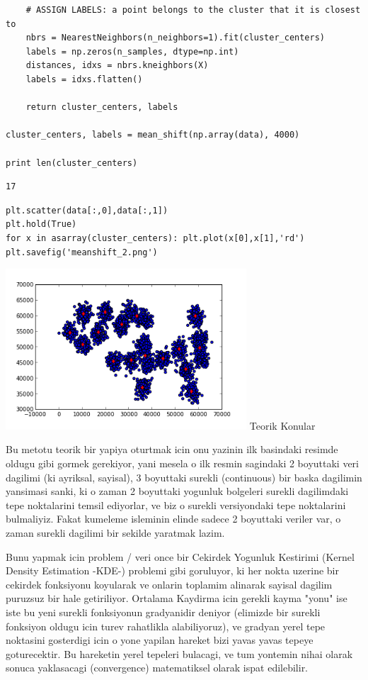\documentclass[12pt,fleqn]{article}\usepackage{../common}
\begin{document}
\begin{verbatim}
    # ASSIGN LABELS: a point belongs to the cluster that it is closest to
    nbrs = NearestNeighbors(n_neighbors=1).fit(cluster_centers)
    labels = np.zeros(n_samples, dtype=np.int)
    distances, idxs = nbrs.kneighbors(X)
    labels = idxs.flatten()
    
    return cluster_centers, labels

cluster_centers, labels = mean_shift(np.array(data), 4000)

print len(cluster_centers)
\end{verbatim}

\begin{verbatim}
17
\end{verbatim}

\begin{verbatim}
plt.scatter(data[:,0],data[:,1])
plt.hold(True)
for x in asarray(cluster_centers): plt.plot(x[0],x[1],'rd')
plt.savefig('meanshift_2.png')
\end{verbatim}

\includegraphics[height=6cm]{meanshift_2.png}
Teorik Konular

Bu metotu teorik bir yapiya oturtmak icin onu yazinin ilk basindaki
resimde oldugu gibi gormek gerekiyor, yani mesela o ilk resmin
sagindaki 2 boyuttaki veri dagilimi (ki ayriksal, sayisal), 3
boyuttaki surekli (continuous) bir baska dagilimin yansimasi sanki, ki
o zaman 2 boyuttaki yogunluk bolgeleri surekli dagilimdaki tepe
noktalarini temsil ediyorlar, ve biz o surekli versiyondaki tepe
noktalarini bulmaliyiz. Fakat kumeleme isleminin elinde sadece 2
boyuttaki veriler var, o zaman surekli dagilimi bir sekilde yaratmak
lazim.

Bunu yapmak icin problem / veri once bir Cekirdek Yogunluk Kestirimi
(Kernel Density Estimation -KDE-) problemi gibi goruluyor, ki her
nokta uzerine bir cekirdek fonksiyonu koyularak ve onlarin toplamim
alinarak sayisal dagilim puruzsuz bir hale getiriliyor. Ortalama
Kaydirma icin gerekli kayma "yonu" ise iste bu yeni surekli
fonksiyonun gradyanidir deniyor (elimizde bir surekli fonksiyon oldugu
icin turev rahatlikla alabiliyoruz), ve gradyan yerel tepe noktasini
gosterdigi icin o yone yapilan hareket bizi yavas yavas tepeye
goturecektir. Bu hareketin yerel tepeleri bulacagi, ve tum yontemin
nihai olarak sonuca yaklasacagi (convergence) matematiksel olarak
ispat edilebilir.
\end{document}
